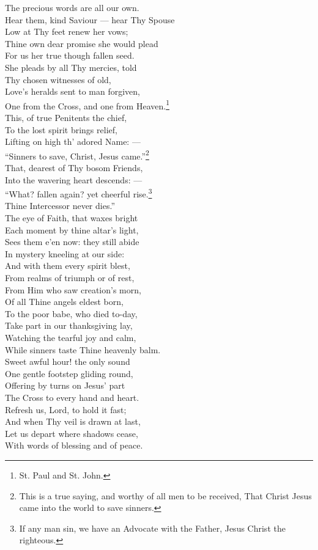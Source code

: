  The precious words are all our own. \\
  Hear them, kind Saviour — hear Thy Spouse \\
 Low at Thy feet renew her vows; \\
 Thine own dear promise she would plead \\
 For us her true though fallen seed. \\
  She pleads by all Thy mercies, told \\
 Thy chosen witnesses of old, \\
 Love’s heralds sent to man forgiven, \\
 One from the Cross, and one from Heaven.\footnote{St. Paul and St. John.} \\
  This, of true Penitents the chief, \\
 To the lost spirit brings relief, \\
 Lifting on high th’ adored Name: — \\
 “Sinners to save, Christ, Jesus came.”\footnote{This is a true saying, and worthy of all men to be received, That Christ Jesus came into the world to save sinners.} \\
  That, dearest of Thy bosom Friends, \\
 Into the wavering heart descends: — \\
 “What? fallen again? yet cheerful rise.\footnote{If any man sin, we have an Advocate with the Father, Jesus Christ the righteous.} \\
 Thine Intercessor never dies.” \\
  The eye of Faith, that waxes bright \\
 Each moment by thine altar’s light, \\
 Sees them e’en now: they still abide \\
 In mystery kneeling at our side: \\
  And with them every spirit blest, \\
 From realms of triumph or of rest, \\
 From Him who saw creation’s morn, \\
 Of all Thine angels eldest born, \\
  To the poor babe, who died to-day, \\
 Take part in our thanksgiving lay, \\
 Watching the tearful joy and calm, \\
 While sinners taste Thine heavenly balm. \\
  Sweet awful hour! the only sound \\
 One gentle footstep gliding round, \\
 Offering by turns on Jesus’ part \\
 The Cross to every hand and heart. \\
  Refresh us, Lord, to hold it fast; \\
 And when Thy veil is drawn at last, \\
 Let us depart where shadows cease, \\
 With words of blessing and of peace.\\

